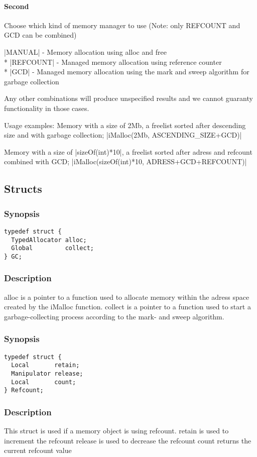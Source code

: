 \paragraph*{Second} Choose which kind of memory manager to use (Note: only REFCOUNT and GCD can be combined)

|MANUAL| - Memory allocation using alloc and free \\*
|REFCOUNT| - Managed memory allocation using reference counter \\*
|GCD| - Managed memory allocation using the mark and sweep algorithm for garbage collection

Any other combinations will produce unspecified results and we cannot guaranty functionality
in those cases.

Usage examples:
Memory with a size of 2Mb, a freelist sorted after descending size and with garbage collection;
|iMalloc(2Mb, ASCENDING\_SIZE+GCD)|

Memory with a size of |sizeOf(int)*10|, a freelist sorted after adress and refcount combined with GCD;
|iMalloc(sizeOf(int)*10, ADRESS+GCD+REFCOUNT)|


\subsection{Structs}
\subsubsection*{Synopsis}
\begin{verbatim}
typedef struct {
  TypedAllocator alloc;
  Global         collect;
} GC;
\end{verbatim}
\subsubsection*{Description}
alloc is a pointer to a function used to allocate memory within the adress space created by the iMalloc function.
collect is a pointer to a function used to start a garbage-collecting process according to the mark- and sweep algorithm.

\subsubsection*{Synopsis}
\begin{verbatim}
typedef struct {
  Local       retain;
  Manipulator release;
  Local       count;
} Refcount;
\end{verbatim}
\subsubsection*{Description}
This struct is used if a memory object is using refcount.
retain is used to increment the refcount
release is used to decrease the refcount
count returns the current refcount value

